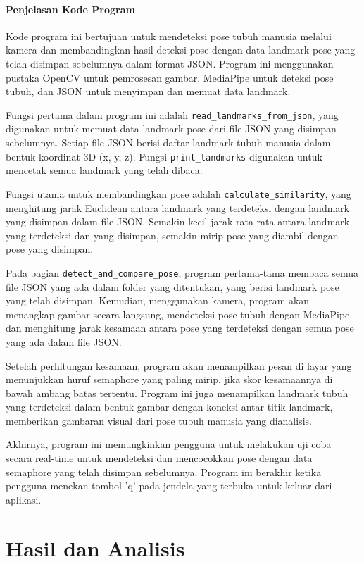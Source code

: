 \documentclass[a4paper,12pt]{article}
\begin{document}
\paragraph{Penjelasan Kode Program} 
Kode program ini bertujuan untuk mendeteksi pose tubuh manusia melalui kamera dan membandingkan hasil deteksi pose dengan data landmark pose yang telah disimpan sebelumnya dalam format JSON. Program ini menggunakan pustaka OpenCV untuk pemrosesan gambar, MediaPipe untuk deteksi pose tubuh, dan JSON untuk menyimpan dan memuat data landmark. 

Fungsi pertama dalam program ini adalah \texttt{read\_landmarks\_from\_json}, yang digunakan untuk memuat data landmark pose dari file JSON yang disimpan sebelumnya. Setiap file JSON berisi daftar landmark tubuh manusia dalam bentuk koordinat 3D (x, y, z). Fungsi \texttt{print\_landmarks} digunakan untuk mencetak semua landmark yang telah dibaca.

Fungsi utama untuk membandingkan pose adalah \texttt{calculate\_similarity}, yang menghitung jarak Euclidean antara landmark yang terdeteksi dengan landmark yang disimpan dalam file JSON. Semakin kecil jarak rata-rata antara landmark yang terdeteksi dan yang disimpan, semakin mirip pose yang diambil dengan pose yang disimpan.

Pada bagian \texttt{detect\_and\_compare\_pose}, program pertama-tama membaca semua file JSON yang ada dalam folder yang ditentukan, yang berisi landmark pose yang telah disimpan. Kemudian, menggunakan kamera, program akan menangkap gambar secara langsung, mendeteksi pose tubuh dengan MediaPipe, dan menghitung jarak kesamaan antara pose yang terdeteksi dengan semua pose yang ada dalam file JSON.

Setelah perhitungan kesamaan, program akan menampilkan pesan di layar yang menunjukkan huruf semaphore yang paling mirip, jika skor kesamaannya di bawah ambang batas tertentu. Program ini juga menampilkan landmark tubuh yang terdeteksi dalam bentuk gambar dengan koneksi antar titik landmark, memberikan gambaran visual dari pose tubuh manusia yang dianalisis.

Akhirnya, program ini memungkinkan pengguna untuk melakukan uji coba secara real-time untuk mendeteksi dan mencocokkan pose dengan data semaphore yang telah disimpan sebelumnya. Program ini berakhir ketika pengguna menekan tombol 'q' pada jendela yang terbuka untuk keluar dari aplikasi.

\section{Hasil dan Analisis}
\end{document}
